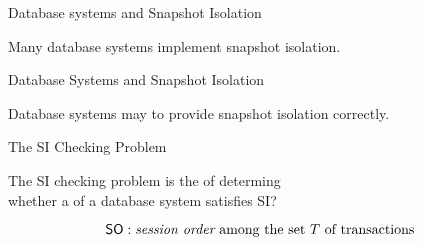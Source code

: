 
\begin{frame}{Database systems and Snapshot Isolation}
  \begin{center}
    Many database systems implement snapshot isolation.

    \vspace{0.30cm}
  \end{center}
\end{frame}

\begin{frame}{Database Systems and Snapshot Isolation}
  \begin{center}
    Database systems may  to provide snapshot isolation correctly.

    \vspace{0.30cm}
  \end{center}
\end{frame}

\begin{frame}{The SI Checking Problem}
  \begin{definition}
    The SI checking problem is the  of determing \\[5pt]
    whether a  of a database system satisfies SI?
  \end{definition}


  \vspace{-0.50cm}
  \[
    \textup{\textsf{SO}}: \text{{\it session order} among the set $T$ of transactions}
  \]
\end{frame}

